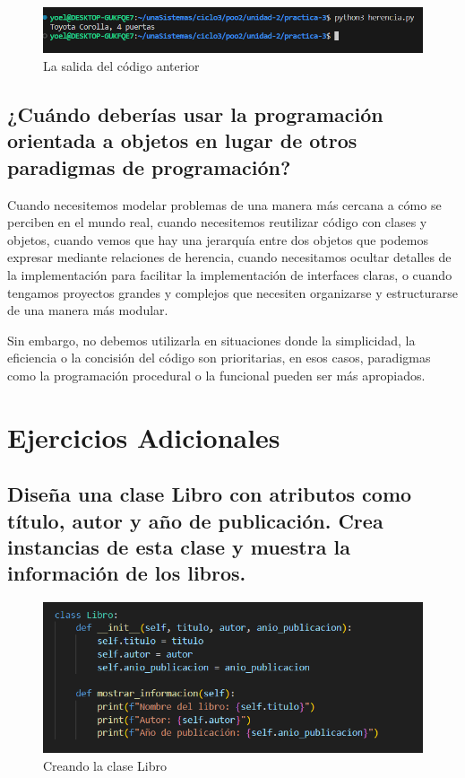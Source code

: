 \documentclass[11pt,a4paper]{article}
\begin{document}
\begin{figure}[H]
    \centering
    \includegraphics[width=0.6\linewidth]{images/11.png}
    \caption{La salida del código anterior}
    \label{fig:enter-label}
\end{figure}


\subsection{¿Cuándo deberías usar la programación orientada a objetos en lugar de otros paradigmas de programación?}

Cuando necesitemos modelar problemas de una manera más cercana a cómo se perciben en el mundo real, cuando necesitemos reutilizar código con clases y objetos, cuando vemos que hay una jerarquía entre dos objetos que podemos expresar mediante relaciones de herencia, cuando necesitamos ocultar detalles de la implementación para facilitar la implementación de interfaces claras, o cuando tengamos proyectos grandes y complejos que necesiten organizarse y estructurarse de una manera más modular.

Sin embargo, no debemos utilizarla en situaciones donde la simplicidad, la eficiencia o la concisión del código son prioritarias, en esos casos, paradigmas como la programación procedural o la funcional pueden ser más apropiados.

\section{Ejercicios Adicionales}


\subsection{Diseña una clase Libro con atributos como título, autor y año de publicación. Crea instancias de esta clase y muestra la información de los libros.}

\begin{figure}[H]
    \centering
    \includegraphics[width=0.7\linewidth]{images/12.png}
    \caption{Creando la clase Libro}
    \label{fig:enter-label}
\end{figure}
\end{document}
